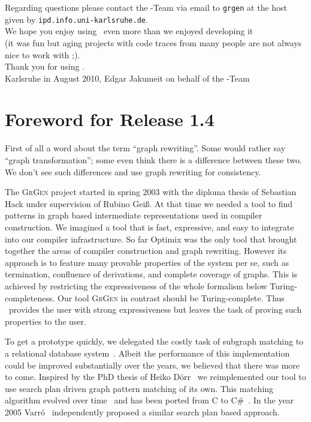 \noindent Regarding questions please contact the \GrG-Team 
via email to \texttt{grgen} at the host given by \texttt{ipd.info.uni-karlsruhe.de}.\\[1ex]

\noindent We hope you enjoy using \GrG\ even more than we enjoyed developing it\\ {\small(it was fun but aging projects with code traces from many people are not always nice to work with ;).}
\\[1ex]

Thank you for using \GrG.\\[2ex]

\noindent Karlsruhe in August 2010, Edgar Jakumeit on behalf of the \GrG-Team

\pagebreak

\chapter*{Foreword for Release 1.4}
First of all a word about the term ``graph rewriting''.
Some would rather say ``graph transformation''; some even think there is a difference between these two.
We don't see such differences and use graph rewriting for consistency.

The \textsc{GrGen} project started in spring 2003 with the diploma thesis of Sebastian Hack under supervision of Rubino Gei\ss.
At that time we needed a tool to find patterns in graph based intermediate representations used in compiler construction.
We imagined a tool that is fast, expressive, and easy to integrate into our compiler infrastructure.
So far Optimix\cite{assmann00graph} was the only tool that brought together the areas of compiler construction and graph rewriting.
However its approach is to feature many provable properties of the system per se, such as termination, confluence of derivations, and complete coverage of graphs.
This is achieved by restricting the expressiveness of the whole formalism below Turing-completeness.
Our tool \textsc{GrGen} in contrast should be Turing-complete.
Thus \GrG\ provides the user with strong expressiveness but leaves the task of proving such properties to the user.

To get a prototype quickly, we delegated the costly task of subgraph matching to a relational database system~\cite{Hac:03}.
Albeit the performance of this implementation could be improved substantially over the years, we believed that there was more to come.
Inspired by the PhD thesis of Heiko D\"orr~\cite{doerr} we reimplemented our tool to use search plan driven graph pattern matching of its own.
This matching algorithm evolved over time~\cite{adam,Bat:05:SA,Bat:05:DA,Bat:06,BKG:07} and has been ported from C to C\#~\cite{KG:07,Kro:07}. 
In the year 2005 Varr\'o~\cite{gramot2005_adapt} independently proposed a similar search plan based approach.

